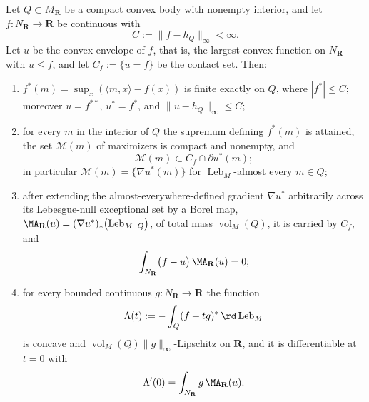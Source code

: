 \begin{theorem}
\label{thm:ch27-legendre-orthogonality}
Let $Q\subset M_{\mathbf R}$ be a compact convex body with nonempty
interior, and let $f:N_{\mathbf R}\to\mathbf R$ be continuous with
\[
 C:=\lVert f-h_Q\rVert_\infty<\infty .
\]
Let $u$ be the convex envelope of $f$, that is, the largest convex
function on $N_{\mathbf R}$ with $u\leq f$, and let
$C_f:=\{u=f\}$ be the contact set.  Then:
\begin{enumerate}
\item $f^*(m)=\sup_{x}(\langle m,x\rangle-f(x))$ is finite exactly on
$Q$, where $|f^*|\leq C$; moreover $u=f^{**}$, $u^*=f^*$, and
$\lVert u-h_Q\rVert_\infty\leq C$;
\item for every $m$ in the interior of $Q$ the supremum defining
$f^*(m)$ is attained, the set $\mathcal M(m)$ of maximizers is compact
and nonempty, and
\[
 \mathcal M(m)\subset C_f\cap\partial u^*(m);
\]
in particular $\mathcal M(m)=\{\nabla u^*(m)\}$ for
$\operatorname{Leb}_M$-almost every $m\in Q$;
\item after extending the almost-everywhere-defined gradient $\nabla u^*$
arbitrarily across its Lebesgue-null exceptional set by a Borel map,
$\MA_{\mathbf R}(u)=(\nabla u^*)_*\bigl(
\operatorname{Leb}_M|_Q\bigr)$, of total mass
$\operatorname{vol}_M(Q)$, it is carried by $C_f$, and
\begin{equation}\label{eq:ch27-convex-orthogonality}
 \int_{N_{\mathbf R}}\bigl(f-u\bigr)\,\MA_{\mathbf R}(u)=0;
\end{equation}
\item for every bounded continuous $g:N_{\mathbf R}\to\mathbf R$ the
function
\[
 \Lambda(t):=-\int_Q(f+tg)^*\,\rd\operatorname{Leb}_M
\]
is concave and $\operatorname{vol}_M(Q)\lVert g\rVert_\infty$-Lipschitz on
$\mathbf R$, and it is differentiable at $t=0$ with
\begin{equation}\label{eq:ch27-convex-derivative}
 \Lambda'(0)=\int_{N_{\mathbf R}}g\,\MA_{\mathbf R}(u).
\end{equation}
\end{enumerate}
\end{theorem}


